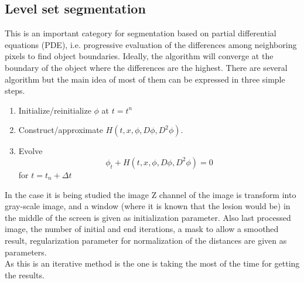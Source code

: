 \documentclass[a4paper, 10pt, conference]{ieeeconf}        %
\begin{document}
 \subsection{Level set segmentation}
 This is an important category for segmentation based on partial differential equations (PDE), i.e. progressive evaluation of the differences among neighboring pixels to find object boundaries. Ideally, the algorithm will converge at the boundary of the object where the differences are the highest. There are several algorithm but the main idea of most of them can be expressed in three simple steps.
 \begin{enumerate}
 \item Initialize/reinitialize $\phi$ at $t = t^{n}$
 \item Construct/approximate $H(t,x,\phi,D\phi,D^{2}\phi)$. 
 \item Evolve
	 \begin{equation}
 		\phi_{t} + H(t,x,\phi,D\phi,D^{2}\phi) = 0
	 \end{equation}
	 for $ t = t_{n} + \Delta t $
 \end{enumerate}
 In the case it is being studied the image Z channel of the image is transform into gray-scale image, and a window (where it is known that the lesion would be) in the middle of the screen is given as initialization parameter. Also last processed image, the number of initial and end iterations, a mask to allow a smoothed result, regularization parameter for normalization of the distances are given as parameters. \\
 As this is an iterative method is the one is taking the most of the time for getting the results. 
\end{document}
